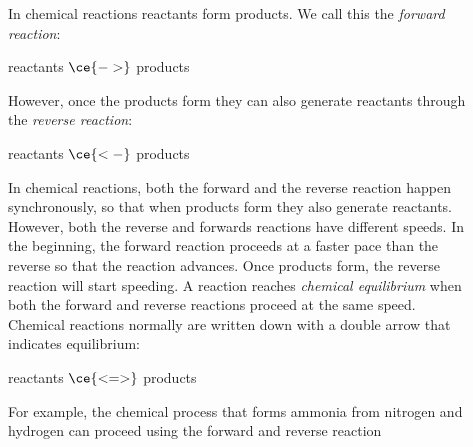 \documentclass[main.tex]{subfiles}
\begin{document}
\begin{description}
\item[] In chemical reactions reactants form products. We call this the \emph{forward reaction}:
\begin{center}reactants $\ce{->}$ products \end{center}
However, once the products form they can also generate reactants through the \emph{reverse reaction}: 
\begin{center}reactants $\ce{<-}$ products\end{center}
\item[] In chemical reactions, both the forward and the reverse reaction happen synchronously, so that when products form they also generate reactants. However, both the reverse and forwards reactions have different speeds. In the beginning, the forward reaction proceeds at a faster pace than the reverse so that the reaction advances. Once products form, the reverse reaction will start speeding. A reaction reaches \emph{chemical equilibrium} when both the forward and reverse reactions proceed at the same speed. 
Chemical reactions normally are written down with a double arrow that indicates equilibrium:
\begin{center}reactants $\ce{<=>}$ products\end{center}
For example, the chemical process that forms ammonia from nitrogen and hydrogen can proceed using the forward and reverse reaction
\begin{center}\end{center}
\begin{marginfigure}[-0cm]%

\end{marginfigure}
\end{description}
\end{document}
